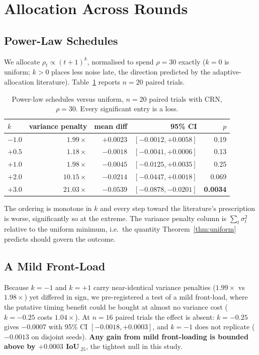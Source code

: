 \section{Allocation Across Rounds}
\label{sec:results-alloc}

\subsection{Power-Law Schedules}

We allocate $\rho_t \propto (t+1)^{k}$, normalised to spend $\rho=30$ exactly
($k=0$ is uniform; $k>0$ places less noise late, the direction predicted by the
adaptive-allocation literature). Table~\ref{tab:headroom} reports $n=20$ paired
trials.

\begin{table}[t]
\centering
\caption{Power-law schedules versus uniform, $n=20$ paired trials with CRN,
$\rho=30$. Every significant entry is a loss.}
\label{tab:headroom}
\begin{tabular}{lrrrr}
\toprule
$k$ & variance penalty & mean diff & 95\% CI & $p$ \\
\midrule
$-1.0$ & $1.99\times$ & $+0.0023$ & $[-0.0012,+0.0058]$ & 0.19 \\
$+0.5$ & $1.18\times$ & $-0.0018$ & $[-0.0041,+0.0006]$ & 0.13 \\
$+1.0$ & $1.98\times$ & $-0.0045$ & $[-0.0125,+0.0035]$ & 0.25 \\
$+2.0$ & $10.15\times$ & $-0.0214$ & $[-0.0447,+0.0018]$ & 0.069 \\
$+3.0$ & $21.03\times$ & $-0.0539$ & $[-0.0878,-0.0201]$ & \textbf{0.0034} \\
\bottomrule
\end{tabular}
\end{table}

The ordering is monotone in $k$ and every step toward the literature's
prescription is worse, significantly so at the extreme. The variance penalty
column is $\sum_t\sigma_t^2$ relative to the uniform minimum, i.e.\ the quantity
Theorem~\ref{thm:uniform} predicts should govern the outcome.

\subsection{A Mild Front-Load}

Because $k=-1$ and $k=+1$ carry near-identical variance penalties
($1.99\times$ vs $1.98\times$) yet differed in sign, we pre-registered a test of
a mild front-load, where the putative timing benefit could be bought at almost no
variance cost ($k=-0.25$ costs $1.04\times$). At $n=16$ paired trials the effect
is absent: $k=-0.25$ gives $-0.0007$ with 95\% CI $[-0.0018,+0.0003]$, and
$k=-1$ does not replicate ($-0.0013$ on disjoint seeds). \textbf{Any gain from
mild front-loading is bounded above by $+0.0003$ IoU$_{.25}$}, the tightest null
in this study.

